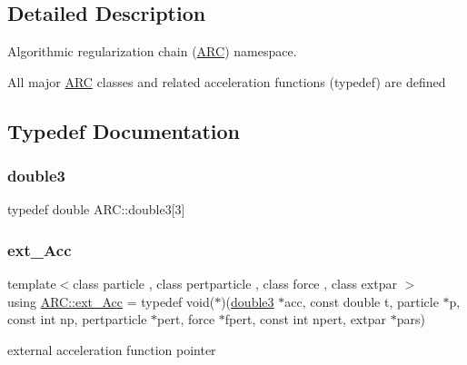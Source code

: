 \subsection{Detailed Description}
Algorithmic regularization chain (\hyperlink{namespaceARC}{A\+RC}) namespace. 

All major \hyperlink{namespaceARC}{A\+RC} classes and related acceleration functions (typedef) are defined 

\subsection{Typedef Documentation}
\hypertarget{namespaceARC_affb4fe085f3ea94b378be8bc9382a75d}{}\label{namespaceARC_affb4fe085f3ea94b378be8bc9382a75d} 
\subsubsection{\texorpdfstring{double3}{double3}}
{\footnotesize\ttfamily typedef double A\+R\+C\+::double3\mbox{[}3\mbox{]}}

\hypertarget{namespaceARC_a7aeda3b3bd009af7ac964748834dd312}{}\label{namespaceARC_a7aeda3b3bd009af7ac964748834dd312} 
\subsubsection{\texorpdfstring{ext\+\_\+\+Acc}{ext\_Acc}}
{\footnotesize\ttfamily template$<$class particle , class pertparticle , class force , class extpar $>$ \\
using \hyperlink{namespaceARC_a7aeda3b3bd009af7ac964748834dd312}{A\+R\+C\+::ext\+\_\+\+Acc} = typedef void($\ast$)(\hyperlink{namespaceARC_affb4fe085f3ea94b378be8bc9382a75d}{double3} $\ast$acc, const double t, particle $\ast$p, const int np, pertparticle $\ast$pert, force $\ast$fpert, const int npert, extpar $\ast$pars)}



external acceleration function pointer 

